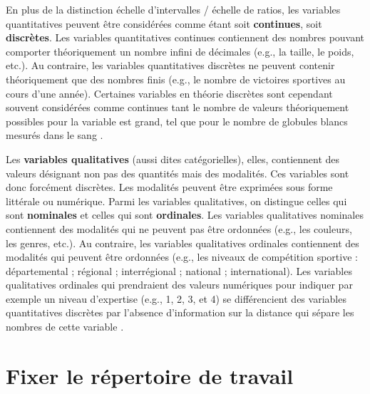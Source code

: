 \documentclass[
  french,
]{book}
\begin{document}
En plus de la distinction échelle d'intervalles / échelle de ratios, les variables quantitatives peuvent être considérées comme étant soit \textbf{continues}, soit \textbf{discrètes}. Les variables quantitatives continues contiennent des nombres pouvant comporter théoriquement un nombre infini de décimales (e.g., la taille, le poids, etc.). Au contraire, les variables quantitatives discrètes ne peuvent contenir théoriquement que des nombres finis (e.g., le nombre de victoires sportives au cours d'une année). Certaines variables en théorie discrètes sont cependant souvent considérées comme continues tant le nombre de valeurs théoriquement possibles pour la variable est grand, tel que pour le nombre de globules blancs mesurés dans le sang \autocite{labreucheDifferentsTypesVariables2010}.

Les \textbf{variables qualitatives} (aussi dites catégorielles), elles, contiennent des valeurs désignant non pas des quantités mais des modalités. Ces variables sont donc forcément discrètes. Les modalités peuvent être exprimées sous forme littérale ou numérique. Parmi les variables qualitatives, on distingue celles qui sont \textbf{nominales} et celles qui sont \textbf{ordinales}. Les variables qualitatives nominales contiennent des modalités qui ne peuvent pas être ordonnées (e.g., les couleurs, les genres, etc.). Au contraire, les variables qualitatives ordinales contiennent des modalités qui peuvent être ordonnées (e.g., les niveaux de compétition sportive : départemental ; régional ; interrégional ; national ; international). Les variables qualitatives ordinales qui prendraient des valeurs numériques pour indiquer par exemple un niveau d'expertise (e.g., 1, 2, 3, et 4) se différencient des variables quantitatives discrètes par l'absence d'information sur la distance qui sépare les nombres de cette variable \autocite{labreucheDifferentsTypesVariables2010}.

\hypertarget{fixer-le-ruxe9pertoire-de-travail}{%
\section{Fixer le répertoire de travail}\label{fixer-le-ruxe9pertoire-de-travail}}
\end{document}
